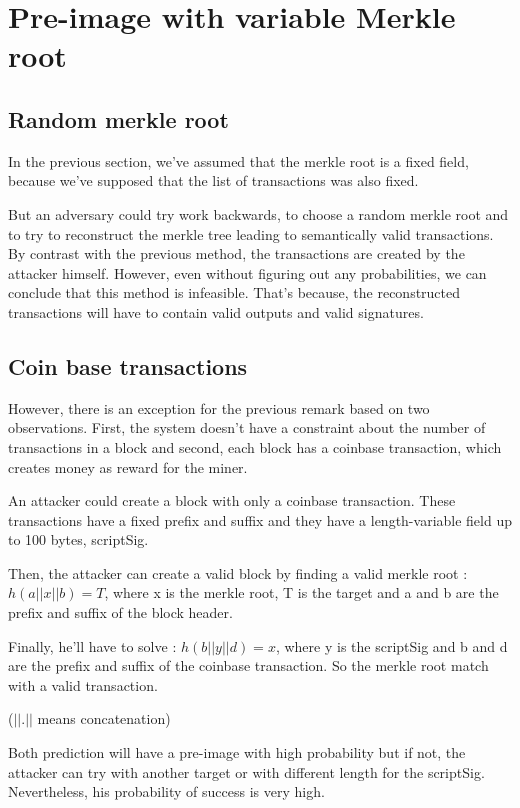 \section{Pre-image with variable Merkle root}

  \subsection{Random merkle root}

In the previous section, we've assumed that the merkle root is a fixed field, because we've supposed that the list of transactions was also fixed. \newline

But an adversary could try work backwards, to choose a random merkle root and to try to reconstruct the merkle tree leading to semantically valid transactions. By contrast with the previous method, the transactions are created by the attacker himself. However, even without figuring out any probabilities, we can conclude that this method is infeasible. That's because, the reconstructed transactions will have to contain valid outputs and valid signatures.

  \subsection{Coin base transactions}

However, there is an exception for the previous remark based on two observations. First, the system doesn't have a constraint about the number of transactions in a block and second, each block has a coinbase transaction, which creates money as reward for the miner. \newline

An attacker could create a block with only a coinbase transaction. These transactions have a fixed prefix and suffix and they have a length-variable field up to 100 bytes, scriptSig.

Then, the attacker can create a valid block by finding a valid merkle root : $h(a || x || b) = T$, where x is the merkle root, T is the target and a and b are the prefix and suffix of the block header.

Finally, he'll have to solve : $h(b || y || d) = x$, where y is the scriptSig and b and d are the prefix and suffix of the coinbase transaction. So the merkle root match with a valid transaction.

($|| . ||$ means concatenation)\newline

Both prediction will have a pre-image with high probability but if not, the attacker can try with another target or with different length for the scriptSig. Nevertheless, his probability of success is very high.
